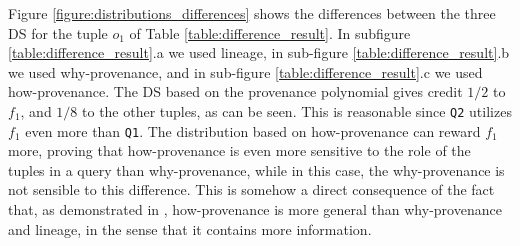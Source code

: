 Figure \ref{figure:distributions_differences} shows the differences between the three DS for the tuple $o_1$ of Table \ref{table:difference_result}. In subfigure \ref{table:difference_result}.a we used lineage, in sub-figure \ref{table:difference_result}.b we used why-provenance, and in sub-figure \ref{table:difference_result}.c we used how-provenance. 
The DS based on the provenance polynomial gives credit $1/2$ to $f_1$, and $1/8$ to the other tuples, as can be seen.
This is reasonable since \texttt{Q2} utilizes $f_1$ even more than \texttt{Q1}. 
The distribution based on how-provenance can reward $f_1$ more, proving that how-provenance is even more sensitive to the role of the tuples in a query than why-provenance, while in this case, the why-provenance is not sensible to this difference. 
This is somehow a direct consequence of the fact that, as demonstrated in \citep{howProvenanceGreen}, how-provenance is more general than why-provenance and lineage, in the sense that it contains more information. 
